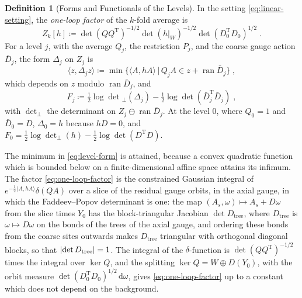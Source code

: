 \documentclass[11pt]{preprint}
\newcommand{\dd}{\mathrm{d}}
\DeclarePairedDelimiter{\abs}{\lvert}{\rvert}
\numberwithin{equation}{section}
\theoremstyle{definition}
\newtheorem{definition}[lemma]{Definition}
\theoremstyle{remark}
\theoremstyle{plain}
\begin{document}
\begin{definition}[Forms and Functionals of the Levels]\label{def:level-functionals}
In the setting \eqref{eq:linear-setting}, the \emph{one-loop factor} of the $k$-fold average is
\begin{equation}\label{eq:one-loop-factor}
    Z_k[h] \coloneqq \det(QQ^{\mathrm T})^{-1/2}\det(h|_W)^{-1/2}\det(D_0^{\mathrm T}D_0)^{1/2}\;.
\end{equation}
For a level $j$, with the average $Q_j$, the restriction $P_j$, and the coarse gauge action $\bar D_j$, the form $\Delta_j$ on $Z_j$ is
\begin{equation}\label{eq:level-form}
    \langle z, \Delta_jz \rangle \coloneqq \min\bigl\{ \langle A, hA \rangle \, \big| \, Q_jA \in z + \operatorname{ran}\bar D_j \bigr\}\;,
\end{equation}
which depends on $z$ modulo $\operatorname{ran}\bar D_j$, and
\begin{equation}\label{eq:level-functional}
    F_j \coloneqq \tfrac12\log\det{}_\perp(\Delta_j) - \tfrac12\log\det(\bar D_j^{\mathrm T}\bar D_j)\;,
\end{equation}
with $\det_\perp$ the determinant on $Z_j \ominus \operatorname{ran}\bar D_j$. At the level $0$, where $Q_0 = 1$ and $\bar D_0 = D$, $\Delta_0 = h$ because $hD = 0$, and $F_0 = \frac12\log\det_\perp(h) - \frac12\log\det(D^{\mathrm T}D)$.
\end{definition}

The minimum in \eqref{eq:level-form} is attained, because a convex quadratic function which is bounded below on a finite-dimensional affine space attains its infimum. The factor \eqref{eq:one-loop-factor} is the constrained Gaussian integral of $e^{-\frac12\langle A, hA \rangle}\delta(QA)$ over a slice of the residual gauge orbits, in the axial gauge, in which the Faddeev--Popov determinant is one: the map $(A_s, \omega) \mapsto A_s + D\omega$ from the slice times $Y_0$ has the block-triangular Jacobian $\det D_{\mathrm{tree}}$, where $D_{\mathrm{tree}}$ is $\omega \mapsto D\omega$ on the bonds of the trees of the axial gauge, and ordering these bonds from the coarse sites outwards makes $D_{\mathrm{tree}}$ triangular with orthogonal diagonal blocks, so that $\abs{\det D_{\mathrm{tree}}} = 1$. The integral of the $\delta$-function is $\det(QQ^{\mathrm T})^{-1/2}$ times the integral over $\ker Q$, and the splitting $\ker Q = W \oplus D(Y_0)$, with the orbit measure $\det(D_0^{\mathrm T}D_0)^{1/2}\,\dd\omega$, gives \eqref{eq:one-loop-factor} up to a constant which does not depend on the background.
\end{document}
